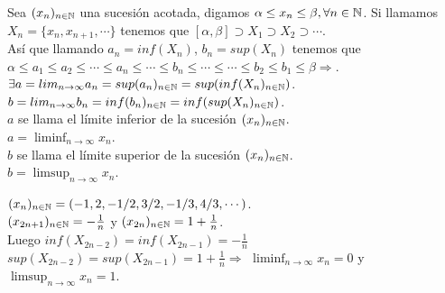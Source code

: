 \begin{definition}
  Sea $(x_n)_{n \in \mathbb{N}}$ una sucesión acotada, digamos $\alpha \leq x_n \leq \beta, \forall n \in \mathbb{N}$.
  Si llamamos $X_n = \{ x_n, x_{n+1}, \cdots \}$ tenemos que $[\alpha, \beta] \supset X_1 \supset X_2 \supset \cdots$. \\
  Así que llamando $a_n = inf(X_n)$, $b_n = sup(X_n)$ tenemos que \\
  $\alpha \leq a_1 \leq a_2 \leq \cdots \leq a_n \leq \cdots \leq b_n \leq \cdots \leq \cdots \leq b_2 \leq b_1 \leq \beta \Rightarrow$. \\
  $\exists a = lim_{n \to \infty} a_n = sup(a_n)_{n \in \mathbb{N}} = sup(inf(X_n)_{n \in \mathbb{N}})$. \\
  $b = lim_{n \to \infty} b_n = inf(b_n)_{n \in \mathbb{N}} = inf(sup(X_n)_{n \in \mathbb{N}})$. \\

  $a$ se llama el límite inferior de la sucesión $(x_n)_{n \in \mathbb{N}}$. \\
  $a = \liminf_{n \to \infty} x_n$. \\

  $b$ se llama el límite superior de la sucesión $(x_n)_{n \in \mathbb{N}}$. \\
  $b = \limsup_{n \to \infty} x_n$.
\end{definition}

\begin{eg}
  $(x_n)_{n \in \mathbb{N}} = (-1, 2, -1/2, 3/2, -1/3, 4/3, \cdots)$. \\
  $(x_{2n+1})_{n \in \mathbb{N}} = -\frac{1}{n}$ y $(x_{2n})_{n \in \mathbb{N}} = 1 + \frac{1}{n}$. \\
  Luego $inf(X_{2n-2}) = inf(X_{2n-1}) = -\frac{1}{n}$ \\
  $sup(X_{2n-2}) = sup(X_{2n-1}) = 1 + \frac{1}{n} \Rightarrow$
  $\liminf_{n \to \infty} x_n = 0$ y $\limsup_{n \to \infty} x_n = 1$.
\end{eg}
